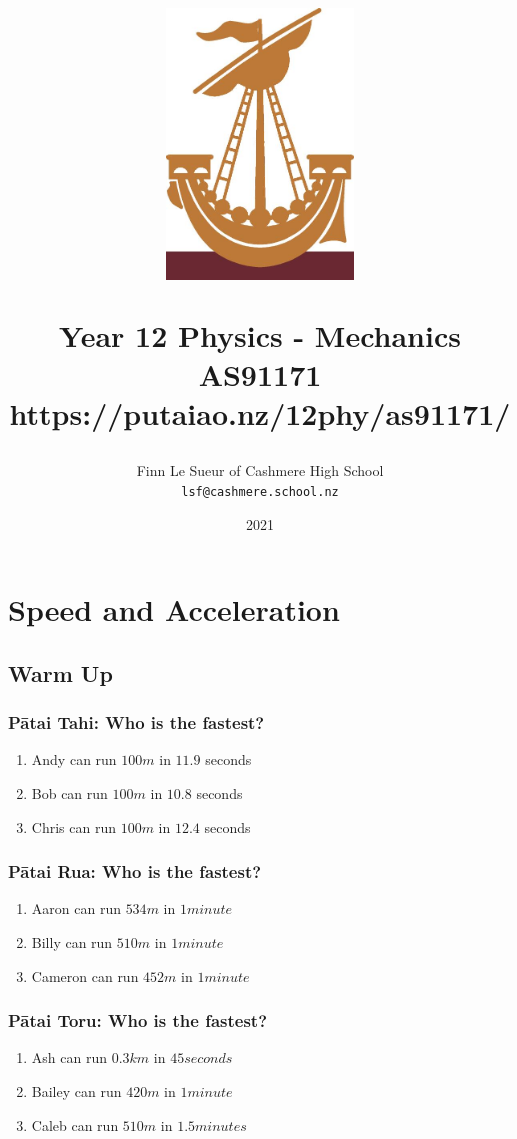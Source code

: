 \documentclass{report}
\title{
\centerline{\includegraphics[width=50mm]{lymphad.jpg}}
\vspace{0.5cm}
Year 12 Physics - Mechanics\\
\vspace{0.5cm}
\large AS91171 \\ https://putaiao.nz/12phy/as91171/\\}
\author{Finn Le Sueur of Cashmere High School\\ \texttt{lsf@cashmere.school.nz}}
\date{2021}
\begin{document}
\maketitle

\newpage
\tableofcontents

\newpage
\chapter{Speed and Acceleration}

\section{Warm Up}

\subsection{Pātai Tahi: Who is the fastest?}

\begin{enumerate}
\item Andy can run $100m$ in $11.9$ seconds
\item Bob can run $100m$ in $10.8$ seconds
\item Chris can run $100m$ in $12.4$ seconds
\end{enumerate}

\vspace{1cm}

\subsection{Pātai Rua: Who is the fastest?}

\begin{enumerate}
\item Aaron can run $534m$ in $1 minute$
\item Billy can run $510m$ in $1 minute$
\item Cameron can run $452m$ in $1 minute$
\end{enumerate}

\vspace{1cm}

\subsection{Pātai Toru: Who is the fastest?}

\begin{enumerate}
\item Ash can run $0.3km$ in $45 seconds$
\item Bailey can run $420m$ in $1 minute$
\item Caleb can run $510m$ in $1.5 minutes$
\end{enumerate}
\end{document}
